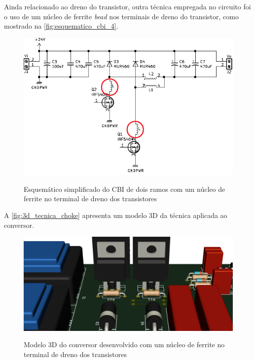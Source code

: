     Ainda relacionado ao dreno do transistor, outra técnica empregada no circuito foi o uso de um núcleo de ferrite \textit{bead} nos terminais de dreno do transistor, como mostrado na \autoref{fig:esquematico_cbi_4}. 
    
    \begin{figure}[H]
    	\centering
    	\caption{Esquemático simplificado do CBI de dois ramos com um núcleo de ferrite no terminal de dreno dos transistores}
    	\includegraphics[scale=1.2]{pdf/layout/Esquematico_CBI_bead.pdf}
        \label{fig:esquematico_cbi_4}
    \end{figure}
    
    A \autoref{fig:3d_tecnica_choke} apresenta um modelo 3D da técnica aplicada ao conversor.
    
    \begin{figure}[H]
    	\centering
    	\caption{Modelo 3D do conversor desenvolvido com um núcleo de ferrite no terminal de dreno dos transistores}
    	\includegraphics[scale=.35]{pdf/fotos/tecnica_choke2.png}
        \label{fig:3d_tecnica_choke}
    \end{figure}
    
